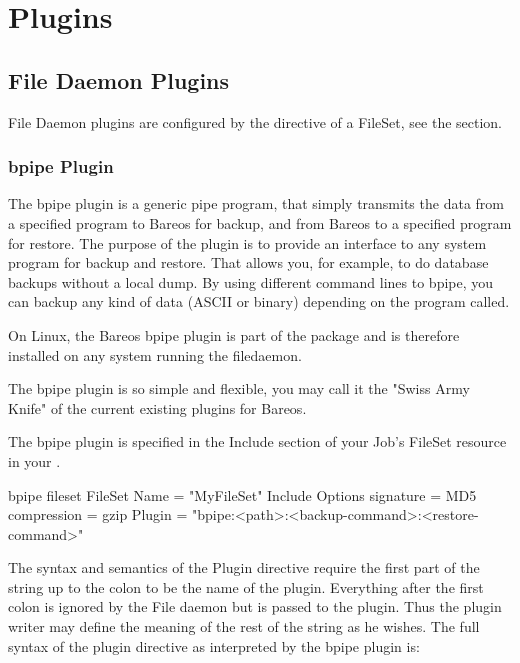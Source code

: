 \chapter{Plugins}

\section{File Daemon Plugins}

File Daemon plugins are configured by the  directive of a FileSet, see the  section.

\subsection{bpipe Plugin}
\label{bpipe}

The bpipe plugin is a generic pipe program, that simply transmits the data from a specified program to Bareos for backup, and
from Bareos to a specified program for restore. The purpose of the plugin is to provide an interface to any system program
for backup and restore. That allows you, for example, to do database backups without a local dump. By using different command 
lines to bpipe, you can backup any kind of data (ASCII or binary) depending on the program called.

On Linux, the Bareos bpipe plugin is part of the  package and is therefore installed on any system running the filedaemon.

The bpipe plugin is so simple and flexible, you may call it the 
"Swiss Army Knife" of the current existing plugins for Bareos.

The bpipe plugin is specified in the Include section of your Job's FileSet resource in your .

\begin{bconfig}{bpipe fileset}
FileSet {
  Name = "MyFileSet"
  Include {
    Options {
      signature = MD5
      compression = gzip
    }
    Plugin = "bpipe:<path>:<backup-command>:<restore-command>"
  }
}
\end{bconfig}

The syntax and semantics of the Plugin directive require the first part of the string up to the colon to be the name of the plugin.
Everything after the first colon is ignored by the File daemon but is passed to the plugin. Thus the plugin writer may define the 
meaning of the rest of the string as he wishes. The full syntax of the plugin directive as interpreted by the bpipe plugin is:

